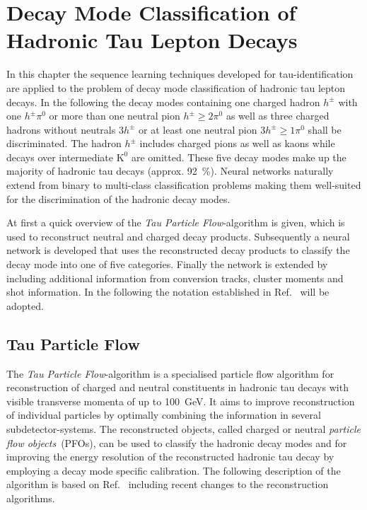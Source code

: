 \chapter{Decay Mode Classification of Hadronic Tau Lepton Decays}
\label{sec:decaymode}

In this chapter the sequence learning techniques developed for
tau-identification are applied to the problem of decay mode classification of
hadronic tau lepton decays. In the following the decay modes containing one
charged hadron $h^\pm$ with one $h^\pm \pi^0$ or more than one neutral pion
$h^\pm \geq 2\pi^0$ as well as three charged hadrons without neutrals $3h^\pm$
or at least one neutral pion $3h^\pm \geq 1\pi^0$ shall be discriminated. The
hadron $h^\pm$ includes charged pions as well as kaons while decays over
intermediate $\text{K}^0$ are omitted. These five decay modes make up the
majority of hadronic tau decays (approx. \SI{92}{\percent}). Neural networks
naturally extend from binary to multi-class classification problems making them
well-suited for the discrimination of the hadronic decay modes.

At first a quick overview of the \emph{Tau Particle Flow}-algorithm is given,
which is used to reconstruct neutral and charged decay products. Subsequently a
neural network is developed that uses the reconstructed decay products to
classify the decay mode into one of five categories. Finally the network is
extended by including additional information from conversion tracks, cluster
moments and shot information. In the following the notation established in
Ref.~\cite{atlas:taurec:decaymodes} will be adopted.



\section{Tau Particle Flow}
\label{sec:tau_pflow}

The \emph{Tau Particle Flow}-algorithm is a specialised particle flow algorithm
for reconstruction of charged and neutral constituents in hadronic tau decays
with visible transverse momenta of up to \SI{100}{\giga\electronvolt}. It aims
to improve reconstruction of individual particles by optimally combining the
information in several subdetector-systems. The reconstructed objects, called
charged or neutral \emph{particle flow objects}~(PFOs), can be used to classify
the hadronic decay modes and for improving the energy resolution of the
reconstructed hadronic tau decay by employing a decay mode specific calibration.
The following description of the algorithm is based on
Ref.~\cite{atlas:taurec:decaymodes} including recent changes to the reconstruction
algorithms.

